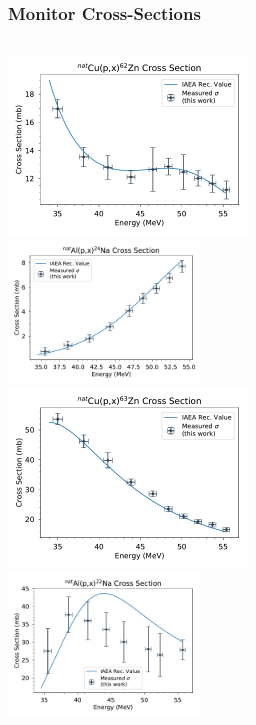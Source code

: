 \documentclass[12pt,xcolor=dvipsnames]{beamer}
\begin{document}
\begin{frame}
\frametitle{Monitor Cross-Sections}
\begin{columns}[c]
\column{2.5in}
\includegraphics[width=2.5in]{cross_sections/62ZN}
\\
\centering
\includegraphics[width=2.0in]{cross_sections/24NA}
\\
\column{2.5in}
\includegraphics[width=2.5in]{cross_sections/63ZN}
\\
\centering
\includegraphics[width=2.0in]{cross_sections/22NA}
\\
\end{columns}
\end{frame}
\end{document}
